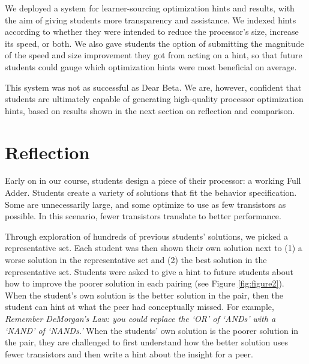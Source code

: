 \documentclass{chi-ext}
\begin{document}
We deployed a system for learner-sourcing optimization hints and results, with the aim of giving students more transparency and assistance. We indexed hints according to whether they were intended to reduce the processor's size, increase its speed, or both. We also gave students the option of submitting the magnitude of the speed and size improvement they got from acting on a hint, so that future students could gauge which optimization hints were most beneficial on average. 

This system was not as successful as Dear Beta. We are, however, confident that students are ultimately capable of generating high-quality processor optimization hints, based on results shown in the next section on reflection and comparison.

\section{Reflection}%

Early on in our course, students design a piece of their processor: a working Full Adder. Students create a variety of solutions that fit the behavior specification. Some are unnecessarily large, and some optimize to use as few transistors as possible. In this scenario, fewer transistors translate to better performance.



Through exploration of hundreds of previous students' solutions, we picked a representative set. Each student was then shown their own solution next to (1) a worse solution in the representative set and (2) the best solution in the representative set. Students were asked to give a hint to future students about how to improve the poorer solution in each pairing (see Figure \ref{fig:figure2}). When the student's own solution is the better solution in the pair, then the student can hint at what the peer had conceptually missed. For example, {\it Remember DeMorgan's Law: you could replace the `OR' of `ANDs' with a `NAND' of `NANDs.'} When the students' own solution is the poorer solution in the pair, they are challenged to first understand how the better solution uses fewer transistors and then write a hint about the insight for a peer.
\end{document}
